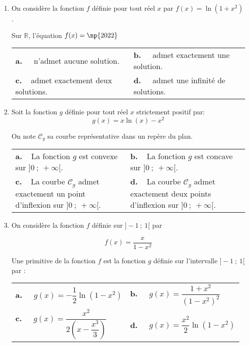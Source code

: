 \documentclass[10pt,a4paper]{article}
\newcommand{\R}{\mathbb{R}}
\begin{document}
\begin{enumerate}
\item On considère la fonction $f$ définie pour tout réel $x$ par $f(x) = \ln \left(1  + x^2\right)$.

Sur $\R$, l'équation $f(x) = \np{2022}$

\begin{center}
\begin{tabularx}{\linewidth}{*{2}{X}}
\textbf{a.~~} n'admet aucune solution. &\textbf{b.~~} admet exactement une solution.\\
\textbf{c.~~}admet exactement deux solutions.&\textbf{d.~~} admet une infinité de solutions.
\end{tabularx}
\end{center}

\item Soit la fonction $g$ définie pour tout réel $x$ strictement positif par: 
\[g(x) = x \ln (x) - x^2\]

On note $\mathcal{C}_g$ sa courbe représentative dans un repère du plan.

\begin{center}
\begin{tabularx}{\linewidth}{*{2}{X}}
\textbf{a.~~}La fonction $g$ est convexe sur $]0~;~+\infty[$.&\textbf{b.~~}La fonction $g$ est concave sur $]0~;~+\infty[$.\\
\textbf{c.~~}La courbe $\mathcal{C}_g$ admet exactement un point d'inflexion sur $]0~;~+\infty[$.&\textbf{d.~~}La courbe $\mathcal{C}_g$ admet exactement
deux points d'inflexion sur $]0~;~+\infty[$.
\end{tabularx}
\end{center}

\item On considère la fonction $f$ définie sur $]- 1~;~1[$ par 

\[f(x) = \dfrac{x}{1 - x^2}\]

Une primitive de la fonction $f$ est la fonction $g$ définie sur l'intervalle $] - 1~;~1[$ par :

\begin{center}
\begin{tabularx}{\linewidth}{*{2}{X}}
\textbf{a.~~} $g(x) = - \dfrac12 \ln \left(1 - x^2\right)$&\textbf{b.~~} $g(x) =  \dfrac{1 + x^2}{ \left(1 - x^2\right)^2}$\\
\textbf{c.~~} $g(x)= \dfrac{x^2}{2\left(x - \dfrac{x^3}{3}\right)}$&\textbf{d.~~} $g(x) = \dfrac{x^2}{2}\ln \left(1 - x^2\right)$
\end{tabularx}
\end{center}


\end{enumerate}
\end{document}

